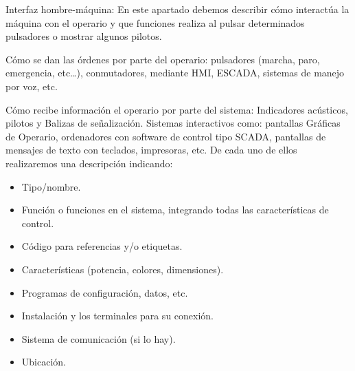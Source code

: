 \clearpage
{}

Interfaz hombre-máquina: En este apartado debemos describir cómo interactúa la máquina con
el operario y que funciones realiza al pulsar determinados pulsadores o mostrar algunos pilotos.

Cómo se dan las órdenes por parte del operario: pulsadores (marcha, paro, emergencia, etc…),
conmutadores, mediante HMI, ESCADA, sistemas de manejo por voz, etc.

Cómo recibe información el operario por parte del sistema: Indicadores acústicos, pilotos y Balizas
de señalización. Sistemas interactivos como: pantallas Gráficas de Operario, ordenadores con
software de control tipo SCADA, pantallas de mensajes de texto con teclados, impresoras, etc.
De cada uno de ellos realizaremos una descripción indicando:

\begin{itemize}
	\item Tipo/nombre.
	\item Función o funciones en el sistema, integrando todas las características de control.
	\item Código para referencias y/o etiquetas.
	\item Características (potencia, colores, dimensiones).
	\item Programas de configuración, datos, etc.
	\item Instalación y los terminales para su conexión.
	\item Sistema de comunicación (si lo hay).
	\item Ubicación.
\end{itemize}
